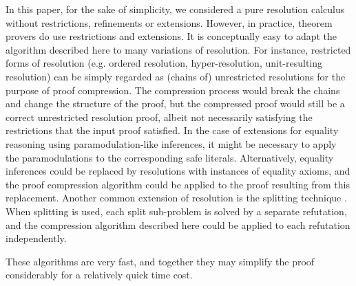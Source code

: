 In this paper, for the sake of simplicity, we considered a pure resolution calculus without restrictions, refinements or extensions. 
However, in practice, theorem provers do use restrictions and extensions. 
It is conceptually easy to adapt the algorithm described here to many variations of resolution. 
For instance, restricted forms of resolution (e.g. ordered resolution, hyper-resolution, unit-resulting resolution) can be simply regarded as (chains of) unrestricted resolutions for the purpose of proof compression. 
The compression process would break the chains and change the structure of the proof, but the compressed proof would still be a correct unrestricted resolution proof, albeit not necessarily satisfying the restrictions that the input proof satisfied. 
In the case of extensions for equality reasoning using paramodulation-like inferences, it might be necessary to apply the paramodulations to the corresponding safe literals. 
Alternatively, equality inferences could be replaced by resolutions with instances of equality axioms, and the proof compression algorithm could be applied to the proof resulting from this replacement. 
Another common extension of resolution is the splitting technique \cite{WeidenbachSplitting}. 
When splitting is used, each split sub-problem is solved by a separate refutation, and the compression algorithm described here could be applied to each refutation independently.

These algorithms are very fast, and together they may simplify the proof considerably for a relatively quick time cost.
